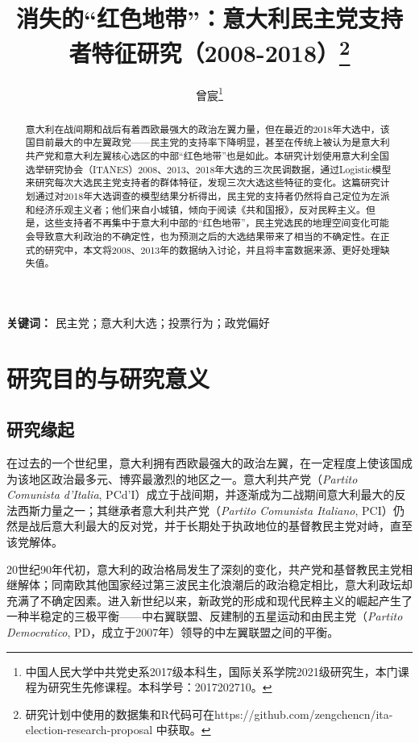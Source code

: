 \documentclass[12pt,a4paper]{ctexart}
\begin{document}
    \title{消失的``红色地带''：意大利民主党支持者特征研究（2008-2018）\thanks{研究计划中使用的数据集和R代码可在https://github.com/zengchencn/ita-election-research-proposal 中获取。}}
    \author{曾宸\thanks{中国人民大学中共党史系2017级本科生，国际关系学院2021级研究生，本门课程为研究生先修课程。本科学号：2017202710。}}
    \maketitle

    \begin{abstract}
        意大利在战间期和战后有着西欧最强大的政治左翼力量，但在最近的2018年大选中，该国目前最大的中左翼政党——民主党的支持率下降明显，甚至在传统上被认为是意大利共产党和意大利左翼核心选区的中部``红色地带''也是如此。本研究计划使用意大利全国选举研究协会（ITANES）2008、2013、2018年大选的三次民调数据，通过Logistic模型来研究每次大选民主党支持者的群体特征，发现三次大选这些特征的变化。这篇研究计划通过对2018年大选调查的模型结果分析得出，民主党的支持者仍然将自己定位为左派和经济乐观主义者；他们来自小城镇，倾向于阅读《共和国报》，反对民粹主义。但是，这些支持者不再集中于意大利中部的``红色地带''，民主党选民的地理空间变化可能会导致意大利政治的不确定性，也为预测之后的大选结果带来了相当的不确定性。在正式的研究中，本文将2008、2013年的数据纳入讨论，并且将丰富数据来源、更好处理缺失值。
    \end{abstract}

    \textbf{关键词：} 民主党；意大利大选；投票行为；政党偏好

    \section{研究目的与研究意义}
    \subsection{研究缘起}
    在过去的一个世纪里，意大利拥有西欧最强大的政治左翼，在一定程度上使该国成为该地区政治最多元、博弈最激烈的地区之一。意大利共产党（\textit{Partito Comunista d'Italia}, PCd'I）成立于战间期，并逐渐成为二战期间意大利最大的反法西斯力量之一；其继承者意大利共产党（\textit{Partito Comunista Italiano}, PCI）仍然是战后意大利最大的反对党，并于长期处于执政地位的基督教民主党对峙，直至该党解体。
    \cite{gunther2000anchors}

    20世纪90年代初，意大利的政治格局发生了深刻的变化，共产党和基督教民主党相继解体；同南欧其他国家经过第三波民主化浪潮后的政治稳定相比，意大利政坛却充满了不确定因素。进入新世纪以来，新政党的形成和现代民粹主义的崛起产生了一种半稳定的三极平衡——中右翼联盟、反建制的五星运动和由民主党（\textit{Partito Democratico}, PD，成立于2007年）领导的中左翼联盟之间的平衡。
    \cite{pasquino2009democratic,fischer2012spatial}
    
\end{document}

